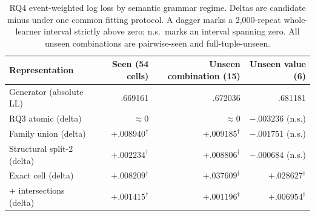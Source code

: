 \begin{table}[t]
  \centering
  \small
  \begin{tabular}{@{}lrrr@{}}
    \toprule
    Representation & Seen (54 cells) &
      Unseen combination (15) & Unseen value (6) \\
    \midrule
    Generator \kstar{} (absolute LL) & .669161 & .672036 & .681181 \\
    RQ3 atomic (delta) & $\approx0$ & $\approx0$ &
      $-.003236$ (n.s.) \\
    Family union (delta) & $+.008940^{\dagger}$ &
      $+.009185^{\dagger}$ & $-.001751$ (n.s.) \\
    Structural split-2 (delta) & $+.002234^{\dagger}$ &
      $+.008806^{\dagger}$ & $-.000684$ (n.s.) \\
    Exact cell (delta) & $+.008209^{\dagger}$ &
      $+.037609^{\dagger}$ & $+.028627^{\dagger}$ \\
    \kstar{} + intersections (delta) & $+.001415^{\dagger}$ &
      $+.001196^{\dagger}$ & $+.006954^{\dagger}$ \\
    \bottomrule
  \end{tabular}
  \caption{RQ4 event-weighted log loss by semantic grammar regime.  Deltas are
  candidate minus \kstar{} under one common fitting protocol.  A dagger marks a
  2,000-repeat whole-learner interval strictly above zero; n.s.\ marks an
  interval spanning zero.  All unseen combinations are pairwise-seen and
  full-tuple-unseen.}
  \label{tab:generalisation-results}
\end{table}
